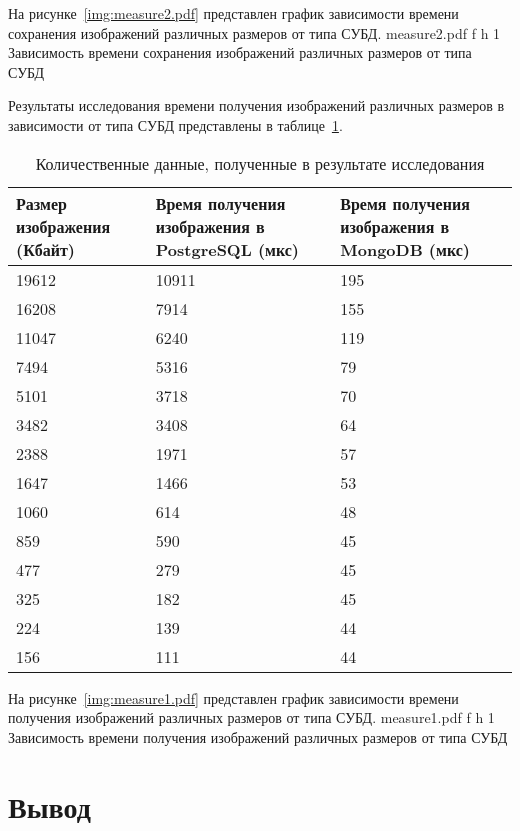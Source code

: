 \clearpage
 
На рисунке~\ref{img:measure2.pdf} представлен график зависимости времени сохранения изображений различных размеров от типа СУБД.
	{measure2.pdf}
	{f}
	{h}
	{1\textwidth}
	{Зависимость времени сохранения изображений различных размеров от типа СУБД}
	
\clearpage

Результаты исследования времени получения изображений различных размеров в зависимости от типа СУБД представлены в таблице~\ref{table:measure1}.
\begin{table}[!ht]
	\centering
	\caption{\label{table:measure1} Количественные данные, полученные в результате исследования}
	\begin{tabularx}{\textwidth}{|X|X|X|}
		\hline
		Размер изображения (Кбайт) & Время получения изображения в PostgreSQL (мкс) & Время получения изображения в MongoDB (мкс) \\ \hline
      	19612 & 10911 & 195 \\ \hline
		16208 & 7914 & 155 \\ \hline
		11047 & 6240 & 119 \\ \hline
		7494 & 5316 & 79 \\ \hline
		5101 & 3718 & 70 \\ \hline
		3482 & 3408 & 64 \\ \hline
		2388 & 1971 & 57 \\ \hline
		1647 & 1466 & 53 \\ \hline
		1060 & 614 & 48 \\ \hline
		859 & 590 & 45 \\ \hline
		477 & 279 & 45 \\ \hline
		325 & 182 & 45 \\ \hline
		224 & 139 & 44 \\ \hline
		156 & 111 & 44 \\ \hline
	\end{tabularx}
\end{table}

\clearpage

На рисунке~\ref{img:measure1.pdf} представлен график зависимости времени получения изображений различных размеров от типа СУБД.
	{measure1.pdf}
	{f}
	{h}
	{1\textwidth}
	{Зависимость времени получения изображений различных размеров от типа СУБД}

\section*{Вывод}

